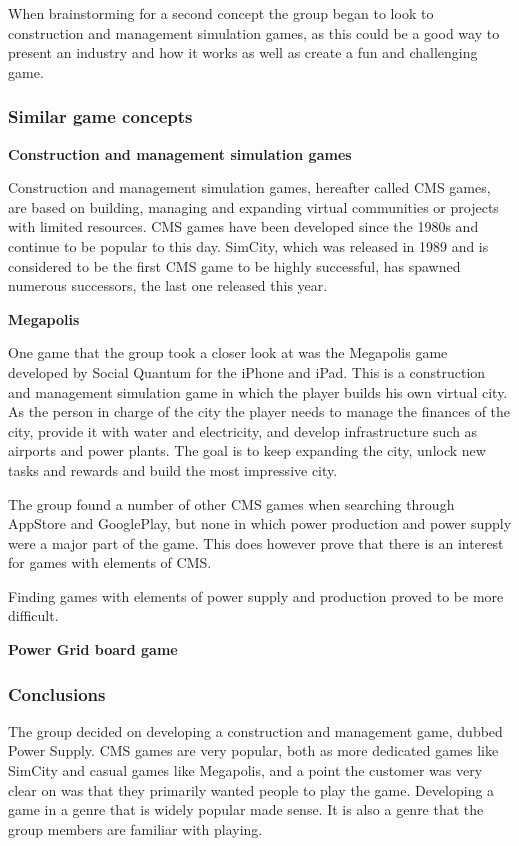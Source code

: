 When brainstorming for a second concept the group began to look to construction
and management simulation games, as this could be a good way to present an
industry and how it works as well as create a fun and challenging game. 

\subsubsection{Similar game concepts}

{\bf Construction and management simulation games}

Construction and management simulation games, hereafter called CMS games, are
based on building, managing and expanding virtual communities or projects
with limited resources. CMS games have been developed since the 1980s and
continue to be popular to this day. SimCity, which was released in 1989 and
is considered to be the first CMS game to be highly successful, has spawned
numerous successors, the last one released this year.

{\bf Megapolis}

One game that the group took a closer look at was the Megapolis game developed
by Social Quantum for the iPhone and iPad. This is a construction and
management simulation game in which the player builds his own virtual city. As
the person in charge of the city the player needs to manage the finances of the
city, provide it with water and electricity, and develop infrastructure such as
airports and power plants. The goal is to keep expanding the city, unlock new
tasks and rewards and build the most impressive city.

The group found a number of other CMS games when searching through AppStore and
GooglePlay, but none in which power production and power supply were a major
part of the game. This does however prove that there is an interest for games
with elements of CMS.

Finding games with elements of power supply and production proved to be more
difficult.

{\bf Power Grid board game}

\subsubsection{Conclusions}

The group decided on developing a construction and management game, dubbed Power Supply. CMS games are very popular, both as more dedicated games like SimCity and casual games like Megapolis, and a point the customer was very clear on was that they primarily wanted people to play the game. Developing a game in a genre that is widely popular made sense. It is also a genre that the group members are familiar with playing.
